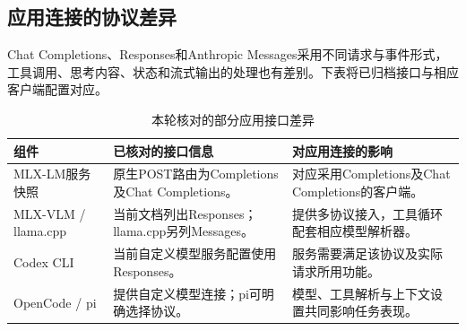 \subsection{应用连接的协议差异}\label{app:protocol}
Chat Completions、Responses和Anthropic Messages采用不同请求与事件形式，工具调用、思考内容、状态和流式输出的处理也有差别。下表将已归档接口与相应客户端配置对应。

\begin{table}[H]\small\centering
\caption{本轮核对的部分应用接口差异}
\begin{tabularx}{\linewidth}{@{}P{34mm}Y Y@{}}\toprule
组件 & 已核对的接口信息 & 对应用连接的影响\\\midrule
MLX-LM服务快照 & 原生POST路由为Completions及Chat Completions。 & 对应采用Completions及Chat Completions的客户端。\\
MLX-VLM / llama.cpp & 当前文档列出Responses；llama.cpp另列Messages。 & 提供多协议接入，工具循环配套相应模型解析器。\\
Codex CLI & 当前自定义模型服务配置使用Responses。 & 服务需要满足该协议及实际请求所用功能。\\
OpenCode / pi & 提供自定义模型连接；pi可明确选择协议。 & 模型、工具解析与上下文设置共同影响任务表现。\\\bottomrule
\end{tabularx}
\end{table}
